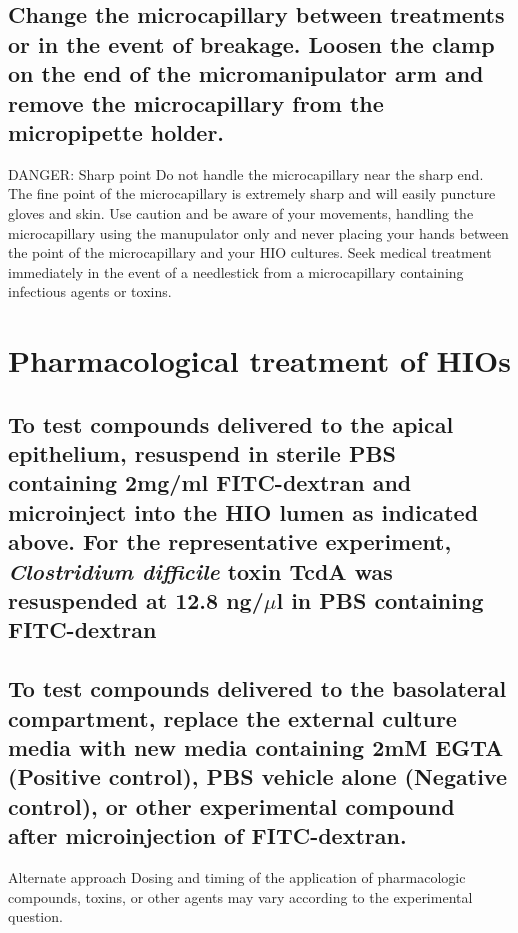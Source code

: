 \documentclass[11pt]{article}
\newcommand\dangersign[1][4ex]{\renewcommand\stacktype{L}\scaleto{\stackon[1pt]{\color{red}$\triangle$}{\tiny !}}{#1}}
\begin{document}
\subsection{{\bfseries\sffamily } Change the microcapillary between treatments or in the event of breakage. Loosen the clamp on the end of the micromanipulator arm and remove the microcapillary from the micropipette holder.}
\label{sec:orgheadline56}
\begin{bclogo}[logo=\dangersign, couleurBarre=red, noborder=true, couleur=yellow!20]{     DANGER: Sharp point}
Do not handle the microcapillary near the sharp end. The fine point of the microcapillary is extremely sharp and will easily puncture gloves and skin. Use caution and be aware of your movements, handling the microcapillary using the manupulator only and never placing your hands between the point of the microcapillary and your HIO cultures. Seek medical treatment immediately in the event of a needlestick from a microcapillary containing infectious agents or toxins.\\
\end{bclogo}

\section{{\bfseries\sffamily } Pharmacological treatment of HIOs}
\label{sec:orgheadline60}
\subsection{{\bfseries\sffamily } To test compounds delivered to the apical epithelium, resuspend in sterile PBS containing 2mg/ml FITC-dextran and microinject into the HIO lumen as indicated above. For the representative experiment, \emph{Clostridium difficile} toxin TcdA was resuspended at 12.8 ng/\(\mu\)l in PBS containing FITC-dextran}
\label{sec:orgheadline58}
\subsection{{\bfseries\sffamily } To test compounds delivered to the basolateral compartment, replace the external culture media with new media containing 2mM EGTA (Positive control), PBS vehicle alone (Negative control), or other experimental compound after microinjection of FITC-dextran.}
\label{sec:orgheadline59}
\begin{bclogo}[logo=\bcinfo, couleurBarre=Black, noborder=true, couleur=gray!10]{     Alternate approach}
Dosing and timing of the application of pharmacologic compounds, toxins, or other agents may vary according to the experimental question.\\
\end{bclogo}
\end{document}
